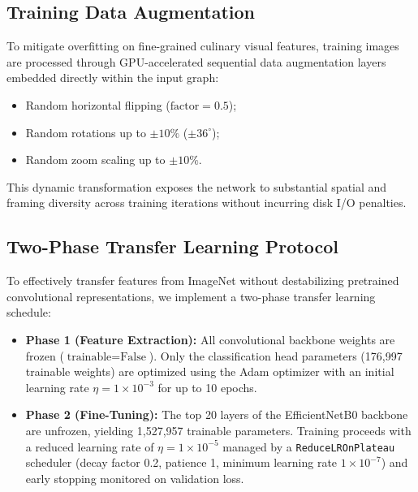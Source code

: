 \documentclass[conference]{IEEEtran}
\begin{document}
\subsection{Training Data Augmentation}
To mitigate overfitting on fine-grained culinary visual features, training images are processed through GPU-accelerated sequential data augmentation layers embedded directly within the input graph:
\begin{itemize}
    \item Random horizontal flipping ($\text{factor} = 0.5$);
    \item Random rotations up to $\pm 10\%$ ($\pm 36^{\circ}$);
    \item Random zoom scaling up to $\pm 10\%$.
\end{itemize}
This dynamic transformation exposes the network to substantial spatial and framing diversity across training iterations without incurring disk I/O penalties.

\subsection{Two-Phase Transfer Learning Protocol}
To effectively transfer features from ImageNet \cite{deng2009imagenet} without destabilizing pretrained convolutional representations, we implement a two-phase transfer learning schedule:
\begin{itemize}
    \item \textbf{Phase 1 (Feature Extraction):} All convolutional backbone weights are frozen ($\text{trainable} = \text{False}$). Only the classification head parameters (176,997 trainable weights) are optimized using the Adam optimizer \cite{kingma2014adam} with an initial learning rate $\eta = 1 \times 10^{-3}$ for up to 10 epochs.
    \item \textbf{Phase 2 (Fine-Tuning):} The top 20 layers of the EfficientNetB0 backbone are unfrozen, yielding 1,527,957 trainable parameters. Training proceeds with a reduced learning rate of $\eta = 1 \times 10^{-5}$ managed by a \texttt{ReduceLROnPlateau} scheduler (decay factor 0.2, patience 1, minimum learning rate $1 \times 10^{-7}$) and early stopping monitored on validation loss.
\end{itemize}
\end{document}
